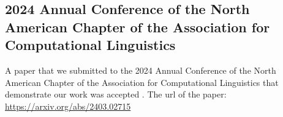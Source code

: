 \begin{appendices}

\chapter{2024 Annual Conference of the North American Chapter of the Association for Computational Linguistics}
\label{apd:B}
A paper that we submitted to the 2024 Annual Conference of the North American Chapter of the Association for Computational Linguistics that demonstrate our work was accepted . The url of the paper: \url{https://arxiv.org/abs/2403.02715}


\end{appendices}
